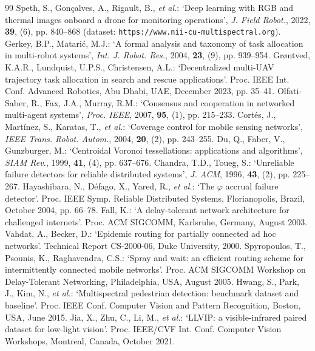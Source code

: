 \begin{thebibliography}{99}
 Speth, S., Gon\c{c}alves, A., Rigault, B., \textit{et al.}: `Deep learning with RGB and thermal images onboard a drone for monitoring operations', \textit{J. Field Robot.}, 2022, \textbf{39}, (6), pp. 840--868 (dataset: \nolinkurl{https://www.nii-cu-multispectral.org}).
 Gerkey, B.P., Matari\'c, M.J.: `A formal analysis and taxonomy of task allocation in multi-robot systems', \textit{Int. J. Robot. Res.}, 2004, \textbf{23}, (9), pp. 939--954.
 Gr{\o}ntved, K.A.R., Lundquist, U.P.S., Christensen, A.L.: `Decentralized multi-UAV trajectory task allocation in search and rescue applications'. Proc. IEEE Int. Conf. Advanced Robotics, Abu Dhabi, UAE, December 2023, pp. 35--41.
 Olfati-Saber, R., Fax, J.A., Murray, R.M.: `Consensus and cooperation in networked multi-agent systems', \textit{Proc. IEEE}, 2007, \textbf{95}, (1), pp. 215--233.
 Cort\'es, J., Mart\'inez, S., Karatas, T., \textit{et al.}: `Coverage control for mobile sensing networks', \textit{IEEE Trans. Robot. Autom.}, 2004, \textbf{20}, (2), pp. 243--255.
 Du, Q., Faber, V., Gunzburger, M.: `Centroidal Voronoi tessellations: applications and algorithms', \textit{SIAM Rev.}, 1999, \textbf{41}, (4), pp. 637--676.
 Chandra, T.D., Toueg, S.: `Unreliable failure detectors for reliable distributed systems', \textit{J. ACM}, 1996, \textbf{43}, (2), pp. 225--267.
 Hayashibara, N., D\'efago, X., Yared, R., \textit{et al.}: `The $\varphi$ accrual failure detector'. Proc. IEEE Symp. Reliable Distributed Systems, Florianopolis, Brazil, October 2004, pp. 66--78.
 Fall, K.: `A delay-tolerant network architecture for challenged internets'. Proc. ACM SIGCOMM, Karlsruhe, Germany, August 2003.
 Vahdat, A., Becker, D.: `Epidemic routing for partially connected ad hoc networks'. Technical Report CS-2000-06, Duke University, 2000.
 Spyropoulos, T., Psounis, K., Raghavendra, C.S.: `Spray and wait: an efficient routing scheme for intermittently connected mobile networks'. Proc. ACM SIGCOMM Workshop on Delay-Tolerant Networking, Philadelphia, USA, August 2005.
 Hwang, S., Park, J., Kim, N., \textit{et al.}: `Multispectral pedestrian detection: benchmark dataset and baseline'. Proc. IEEE Conf. Computer Vision and Pattern Recognition, Boston, USA, June 2015.
 Jia, X., Zhu, C., Li, M., \textit{et al.}: `LLVIP: a visible-infrared paired dataset for low-light vision'. Proc. IEEE/CVF Int. Conf. Computer Vision Workshops, Montreal, Canada, October 2021.

\end{thebibliography}
